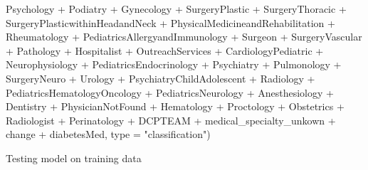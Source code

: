 \documentclass[
]{article}
\newenvironment{Shaded}{\begin{snugshade}}{\end{snugshade}}
\newcommand{\AttributeTok}[1]{\textcolor[rgb]{0.77,0.63,0.00}{#1}}
\newcommand{\FunctionTok}[1]{\textcolor[rgb]{0.00,0.00,0.00}{#1}}
\newcommand{\NormalTok}[1]{#1}
\newcommand{\OtherTok}[1]{\textcolor[rgb]{0.56,0.35,0.01}{#1}}
\newcommand{\SpecialCharTok}[1]{\textcolor[rgb]{0.00,0.00,0.00}{#1}}
\newcommand{\StringTok}[1]{\textcolor[rgb]{0.31,0.60,0.02}{#1}}
\begin{document}
\begin{Shaded}
\begin{Highlighting}[]
\NormalTok{        Psychology }\SpecialCharTok{+}\NormalTok{ Podiatry }\SpecialCharTok{+}\NormalTok{ Gynecology }\SpecialCharTok{+}\NormalTok{ SurgeryPlastic }\SpecialCharTok{+}
\NormalTok{        SurgeryThoracic }\SpecialCharTok{+}\NormalTok{ SurgeryPlasticwithinHeadandNeck }\SpecialCharTok{+}
\NormalTok{        PhysicalMedicineandRehabilitation }\SpecialCharTok{+}\NormalTok{ Rheumatology }\SpecialCharTok{+}
\NormalTok{        PediatricsAllergyandImmunology }\SpecialCharTok{+}\NormalTok{ Surgeon }\SpecialCharTok{+}
\NormalTok{        SurgeryVascular }\SpecialCharTok{+}\NormalTok{ Pathology }\SpecialCharTok{+}\NormalTok{ Hospitalist }\SpecialCharTok{+}
\NormalTok{        OutreachServices }\SpecialCharTok{+}\NormalTok{ CardiologyPediatric }\SpecialCharTok{+}\NormalTok{ Neurophysiology }\SpecialCharTok{+}
\NormalTok{        PediatricsEndocrinology }\SpecialCharTok{+}\NormalTok{ Psychiatry }\SpecialCharTok{+}\NormalTok{ Pulmonology }\SpecialCharTok{+}
\NormalTok{        SurgeryNeuro }\SpecialCharTok{+}\NormalTok{ Urology }\SpecialCharTok{+}\NormalTok{ PsychiatryChildAdolescent }\SpecialCharTok{+}
\NormalTok{        Radiology }\SpecialCharTok{+}\NormalTok{ PediatricsHematologyOncology }\SpecialCharTok{+}
\NormalTok{        PediatricsNeurology }\SpecialCharTok{+}\NormalTok{ Anesthesiology }\SpecialCharTok{+}\NormalTok{ Dentistry }\SpecialCharTok{+}
\NormalTok{        PhysicianNotFound }\SpecialCharTok{+}\NormalTok{ Hematology }\SpecialCharTok{+}\NormalTok{ Proctology }\SpecialCharTok{+}
\NormalTok{        Obstetrics }\SpecialCharTok{+}\NormalTok{ Radiologist }\SpecialCharTok{+}\NormalTok{ Perinatology }\SpecialCharTok{+}\NormalTok{ DCPTEAM }\SpecialCharTok{+}
\NormalTok{        medical\_specialty\_unkown }\SpecialCharTok{+}\NormalTok{ change }\SpecialCharTok{+}\NormalTok{ diabetesMed,}
    \AttributeTok{type =} \StringTok{"classification"}\NormalTok{)}
\end{Highlighting}
\end{Shaded}

Testing model on training data

\begin{Shaded}
\end{Shaded}
\end{document}
